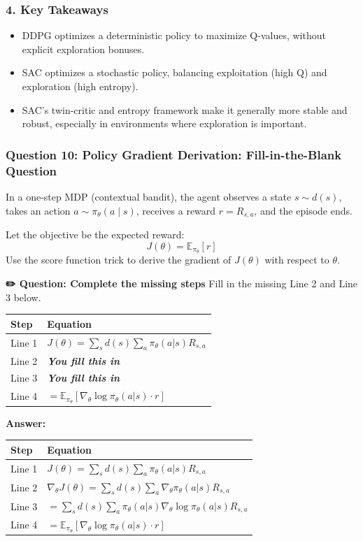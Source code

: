 \documentclass[12pt]{article}
\begin{document}
\subsubsection*{4. Key Takeaways}
\begin{itemize}
    \item DDPG optimizes a deterministic policy to maximize Q-values, without explicit exploration bonuses.
    \item SAC optimizes a stochastic policy, balancing exploitation (high Q) and exploration (high entropy).
    \item SAC's twin-critic and entropy framework make it generally more stable and robust, especially in environments where exploration is important.
\end{itemize}

\subsubsection*{Question 10: Policy Gradient Derivation: Fill-in-the-Blank Question}

In a one-step MDP (contextual bandit), the agent observes a state $s \sim d(s)$, takes an action $a \sim \pi_\theta(a\mid s)$, receives a reward $r=R_{s,a}$, and the episode ends.

Let the objective be the expected reward:
\[ J(\theta) = \mathbb{E}_{\pi_\theta}[r] \]
Use the score function trick to derive the gradient of $J(\theta)$ with respect to $\theta$.


\item \textbf{✏️ Question: Complete the missing steps}
Fill in the missing Line 2 and Line 3 below.
\begin{center}
\begin{tabular}{|l|l|}
\hline
\textbf{Step} & \textbf{Equation} \\
\hline
Line 1 & $J(\theta) = \sum_s d(s) \sum_a \pi_\theta(a|s) R_{s,a}$ \\
\hline
Line 2 & \textbf{\textit{You fill this in}} \\
\hline
Line 3 & \textbf{\textit{You fill this in}} \\
\hline
Line 4 & $ = \mathbb{E}_{\pi_\theta} \left[ \nabla_\theta \log \pi_\theta(a|s) \cdot r \right]$ \\
\hline
\end{tabular}
\end{center}

\item \textbf{Answer:} 
\begin{tabular}{|l|l|}
\hline
\textbf{Step} & \textbf{Equation} \\
\hline
Line 1 & $J(\theta) = \sum_s d(s) \sum_a \pi_\theta(a|s) R_{s,a}$ \\
\hline
Line 2 & $\nabla_\theta J(\theta) = \sum_s d(s) \sum_a \nabla_\theta \pi_\theta(a|s) R_{s,a}$ \\
\hline
Line 3 & $ = \sum_s d(s) \sum_a \pi_\theta(a|s) \nabla_\theta \log \pi_\theta(a|s) R_{s,a}$ \\
\hline
Line 4 & $ = \mathbb{E}_{\pi_\theta} \left[ \nabla_\theta \log \pi_\theta(a|s) \cdot r \right]$ \\
\hline
\end{tabular}
\end{document}
